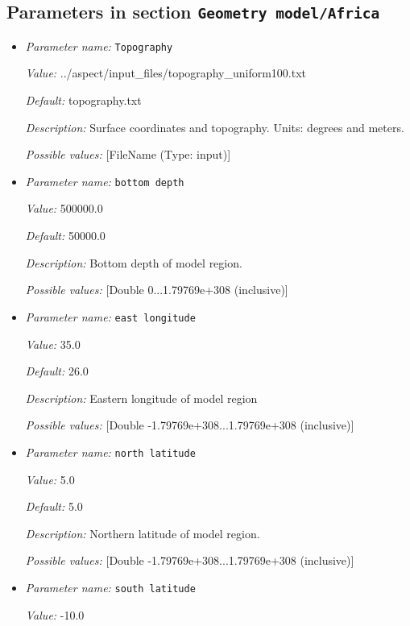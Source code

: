 \subsection{Parameters in section \tt Geometry model/Africa}
\label{parameters:Geometry_20model/Africa}

\begin{itemize}
\item {\it Parameter name:} {\tt Topography}


{\it Value:} ../aspect/input_files/topography_uniform100.txt


{\it Default:} topography.txt


{\it Description:} Surface coordinates and topography. Units: degrees and meters.


{\it Possible values:} [FileName (Type: input)]
\item {\it Parameter name:} {\tt bottom depth}


{\it Value:} 500000.0


{\it Default:} 50000.0


{\it Description:} Bottom depth of model region.


{\it Possible values:} [Double 0...1.79769e+308 (inclusive)]
\item {\it Parameter name:} {\tt east longitude}


{\it Value:} 35.0


{\it Default:} 26.0


{\it Description:} Eastern longitude of model region


{\it Possible values:} [Double -1.79769e+308...1.79769e+308 (inclusive)]
\item {\it Parameter name:} {\tt north latitude}


{\it Value:} 5.0


{\it Default:} 5.0


{\it Description:} Northern latitude of model region.


{\it Possible values:} [Double -1.79769e+308...1.79769e+308 (inclusive)]
\item {\it Parameter name:} {\tt south latitude}


{\it Value:} -10.0



\end{itemize}
